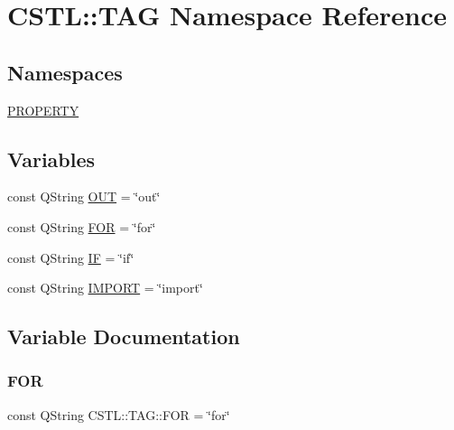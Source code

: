 \hypertarget{namespace_c_s_t_l_1_1_t_a_g}{}\section{C\+S\+TL\+:\+:T\+AG Namespace Reference}
\label{namespace_c_s_t_l_1_1_t_a_g}
\subsection*{Namespaces}
\begin{DoxyCompactItemize}
\item 
 \hyperlink{namespace_c_s_t_l_1_1_t_a_g_1_1_p_r_o_p_e_r_t_y}{P\+R\+O\+P\+E\+R\+TY}
\end{DoxyCompactItemize}
\subsection*{Variables}
\begin{DoxyCompactItemize}
\item 
const Q\+String \hyperlink{namespace_c_s_t_l_1_1_t_a_g_a571de1dbd161be84d2fa933b4cddebbf}{O\+UT} = \char`\"{}out\char`\"{}
\item 
const Q\+String \hyperlink{namespace_c_s_t_l_1_1_t_a_g_a6136661d958e371a22942ffe80e83eaf}{F\+OR} = \char`\"{}for\char`\"{}
\item 
const Q\+String \hyperlink{namespace_c_s_t_l_1_1_t_a_g_a4bde9fae9f99e2493ddc220b79baca10}{IF} = \char`\"{}if\char`\"{}
\item 
const Q\+String \hyperlink{namespace_c_s_t_l_1_1_t_a_g_a64ed2b372fc186335ad18c67ee9744bf}{I\+M\+P\+O\+RT} = \char`\"{}import\char`\"{}
\end{DoxyCompactItemize}


\subsection{Variable Documentation}
\mbox{\label{namespace_c_s_t_l_1_1_t_a_g_a6136661d958e371a22942ffe80e83eaf}} 
\subsubsection{\texorpdfstring{F\+OR}{FOR}}
{\footnotesize\ttfamily const Q\+String C\+S\+T\+L\+::\+T\+A\+G\+::\+F\+OR = \char`\"{}for\char`\"{}}

